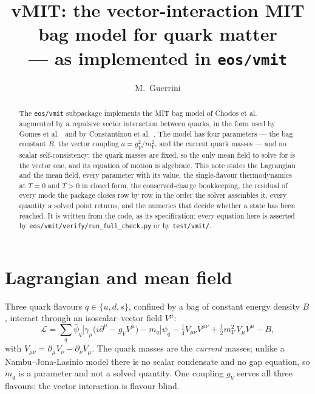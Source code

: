 \documentclass[aps,prc,onecolumn,superscriptaddress,nofootinbib,10pt]{revtex4-2}
\begin{document}
\title{vMIT: the vector-interaction MIT bag model for quark matter \\
       --- as implemented in \texttt{eos/vmit}}

\author{M.~Guerrini}

\begin{abstract}
The \texttt{eos/vmit} subpackage implements the MIT bag model of
Chodos et al.~\cite{Chodos1974} augmented by a repulsive vector interaction
between quarks, in the form used by Gomes et al.~\cite{Gomes2019} and by
Constantinou et al.~\cite{Constantinou2021,Constantinou2023}. The model has
four parameters --- the bag constant $B$, the vector coupling
$a = g_V^2/m_V^2$, and the current quark masses --- and no scalar
self-consistency: the quark masses are fixed, so the only mean field to solve
for is the vector one, and its equation of motion is algebraic. This note
states the Lagrangian and the mean field, every parameter with its value, the
single-flavour thermodynamics at $T = 0$ and $T > 0$ in closed form, the
conserved-charge bookkeeping, the residual of every mode the package closes
row by row in the order the solver assembles it, every quantity a solved point
returns, and the numerics that decide whether a state has been reached. It is
written from the code, as its specification: every equation here is asserted by
\texttt{eos/vmit/verify/run\_full\_check.py} or by \texttt{test/vmit/}.
\end{abstract}

\maketitle

\section{Lagrangian and mean field}
\label{sec:lagrangian}

Three quark flavours $q \in \{u, d, s\}$, confined by a bag of constant energy
density $B$, interact through an isoscalar--vector field $V^\mu$:
%
\begin{equation}
\mathcal{L} = \sum_q \bar\psi_q \big[ \gamma_\mu \big( i\partial^\mu
      - g_V V^\mu \big) - m_q \big] \psi_q
      - \tfrac14 V_{\mu\nu} V^{\mu\nu} + \tfrac12 m_V^2\, V_\mu V^\mu
      - B ,
\label{eq:lagrangian}
\end{equation}
%
with $V_{\mu\nu} = \partial_\mu V_\nu - \partial_\nu V_\mu$. The quark masses
are the \emph{current} masses; unlike a Nambu--Jona-Lasinio model there is no
scalar condensate and no gap equation, so $m_q$ is a parameter and not a
solved quantity. One coupling $g_V$ serves all three flavours: the vector
interaction is flavour blind.
\end{document}
